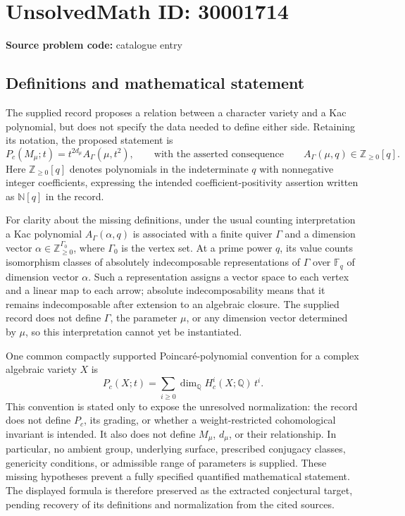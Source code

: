 \documentclass[11pt]{article}
\begin{document}
\section*{UnsolvedMath ID: 30001714}
\textbf{Source problem code:} catalogue entry
\subsection{Definitions and mathematical statement}
The supplied record proposes a relation between a character variety and a Kac polynomial, but does not specify the data needed to define either side. Retaining its notation, the proposed statement is
\[
P_c(M_\mu;t)=t^{2d_\mu}A_\Gamma(\mu,t^2),
\qquad\text{with the asserted consequence}\qquad
A_\Gamma(\mu,q)\in\mathbb Z_{\geq 0}[q].
\]
Here \(\mathbb Z_{\geq 0}[q]\) denotes polynomials in the indeterminate \(q\) with nonnegative integer coefficients, expressing the intended coefficient-positivity assertion written as \(\mathbb N[q]\) in the record.

For clarity about the missing definitions, under the usual counting interpretation a Kac polynomial \(A_\Gamma(\alpha,q)\) is associated with a finite quiver \(\Gamma\) and a dimension vector \(\alpha\in\mathbb Z_{\geq 0}^{\Gamma_0}\), where \(\Gamma_0\) is the vertex set. At a prime power \(q\), its value counts isomorphism classes of absolutely indecomposable representations of \(\Gamma\) over \(\mathbb F_q\) of dimension vector \(\alpha\). Such a representation assigns a vector space to each vertex and a linear map to each arrow; absolute indecomposability means that it remains indecomposable after extension to an algebraic closure. The supplied record does not define \(\Gamma\), the parameter \(\mu\), or any dimension vector determined by \(\mu\), so this interpretation cannot yet be instantiated.

One common compactly supported Poincar\'e-polynomial convention for a complex algebraic variety \(X\) is
\[
P_c(X;t)=\sum_{i\geq 0}\dim_{\mathbb Q}H_c^i(X;\mathbb Q)\,t^i.
\]
This convention is stated only to expose the unresolved normalization: the record does not define \(P_c\), its grading, or whether a weight-restricted cohomological invariant is intended. It also does not define \(M_\mu\), \(d_\mu\), or their relationship. In particular, no ambient group, underlying surface, prescribed conjugacy classes, genericity conditions, or admissible range of parameters is supplied. These missing hypotheses prevent a fully specified quantified mathematical statement. The displayed formula is therefore preserved as the extracted conjectural target, pending recovery of its definitions and normalization from the cited sources.
\end{document}
